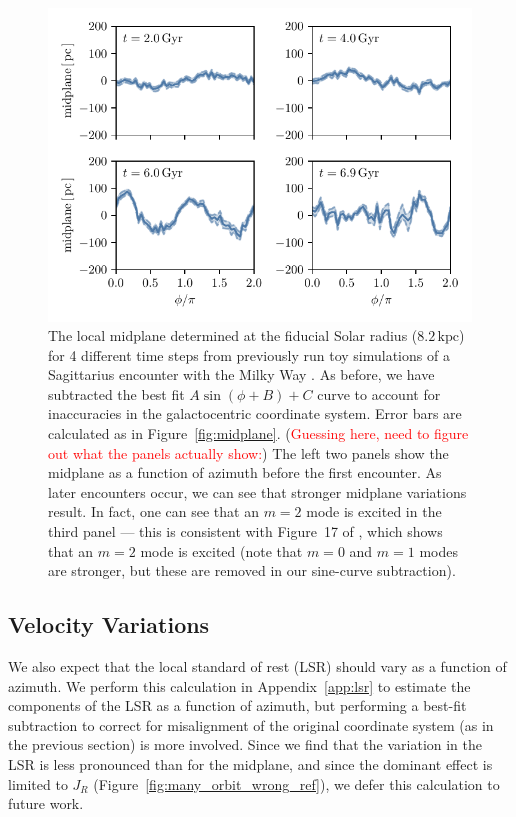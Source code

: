 \documentclass[twocolumn]{aastex62}
\newcommand{\Gus}[1]{\textcolor{red}{#1}}
\newcommand{\kpc}{\text{kpc}}
\begin{document}
\begin{figure}
\begin{center}
\includegraphics[width=342.078286667pt]{fig/midplane_fit_chervinsim.pdf}
\end{center}
\caption{The local midplane determined at the fiducial Solar radius
($8.2\,\kpc$) for 4 different time steps from previously run toy simulations
of a Sagittarius encounter with the Milky Way \citep{2018MNRAS.481..286L}. As
before, we have subtracted the best fit $A\sin{(\phi+B)}+C$ curve to account
for inaccuracies in the galactocentric coordinate system. Error bars are
calculated as in Figure~\ref{fig:midplane}. (\Gus{Guessing here, need to
figure out what the panels actually show:}) The left two panels show the
midplane as a function of azimuth before the first encounter. As later
encounters occur, we can see that stronger midplane variations result. In
fact, one can see that an $m=2$ mode is excited in the third panel --- this is
consistent with Figure~17 of \citet{2018MNRAS.481..286L}, which shows that an
$m=2$ mode is excited (note that $m=0$ and $m=1$ modes are stronger, but these
are removed in our sine-curve subtraction).}
\label{fig:midplane_chervin}
\end{figure}

\subsection{Velocity Variations} \label{ssec:lsr_var}
We also expect that the local standard of rest (LSR) should vary as a function
of azimuth. We perform this calculation in Appendix~\ref{app:lsr} to estimate
the components of the LSR as a function of azimuth, but performing a best-fit
subtraction to correct for misalignment of the original coordinate system (as
in the previous section) is more involved. Since we find that the variation in
the LSR is less pronounced than for the midplane, and since the dominant
effect is limited to $J_R$ (Figure~\ref{fig:many_orbit_wrong_ref}), we defer
this calculation to future work.
\end{document}
